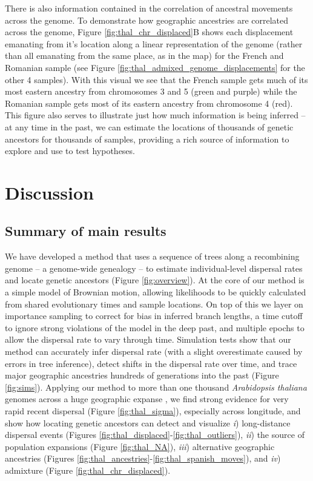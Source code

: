 \documentclass[12pt]{article}
\begin{document}
There is also information contained in the correlation of ancestral movements across the genome. 
To demonstrate how geographic ancestries are correlated across the genome, Figure \ref{fig:thal_chr_displaced}B shows each displacement emanating from it's location along a linear representation of the genome (rather than all emanating from the same place, as in the map) for the French and Romanian sample (see Figure \ref{fig:thal_admixed_genome_displacements} for the other 4 samples).
With this visual we see that the French sample gets much of its most eastern ancestry from chromosomes 3 and 5 (green and purple) while the Romanian sample gets most of its eastern ancestry from chromosome 4 (red).
This figure also serves to illustrate just how much information is being inferred -- at any time in the past, we can estimate the locations of thousands of genetic ancestors for thousands of samples, providing a rich source of information to explore and use to test hypotheses.

\section*{Discussion}

\subsection*{Summary of main results}

We have developed a method that uses a sequence of trees along a recombining genome -- a genome-wide genealogy -- to estimate individual-level dispersal rates and locate genetic ancestors (Figure \ref{fig:overview}). 
At the core of our method is a simple model of Brownian motion, allowing likelihoods to be quickly calculated from shared evolutionary times and sample locations.
On top of this we layer on importance sampling to correct for bias in inferred branch lengths, a time cutoff to ignore strong violations of the model in the deep past, and multiple epochs to allow the dispersal rate to vary through time. 
Simulation tests show that our method can accurately infer dispersal rate (with a slight overestimate caused by errors in tree inference), detect shifts in the dispersal rate over time, and trace major geographic ancestries hundreds of generations into the past (Figure \ref{fig:sims}).
Applying our method to more than one thousand \textit{Arabidopsis thaliana} genomes across a huge geographic expanse \citep{alonso2016}, we find strong evidence for very rapid recent dispersal (Figure \ref{fig:thal_sigma}), especially across longitude, and show how locating genetic ancestors can detect and visualize \textit{i}) long-distance dispersal events (Figures \ref{fig:thal_displaced}-\ref{fig:thal_outliers}), \textit{ii}) the source of population expansions (Figure \ref{fig:thal_NA}), \textit{iii}) alternative geographic ancestries (Figures \ref{fig:thal_ancestries}-\ref{fig:thal_spanish_moves}), and \textit{iv}) admixture (Figure \ref{fig:thal_chr_displaced}).
\end{document}
